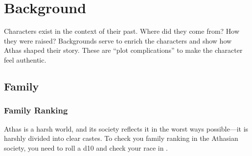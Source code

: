 \section{Background}
Characters exist in the context of their past. Where did they come from? How they were raised? Backgrounds serve to enrich the characters and show how Athas shaped their story. These are ``plot complications'' to make the character feel authentic.

\subsection{Family}

\subsubsection{Family Ranking}
Athas is a harsh world, and its society reflects it in the worst ways possible---it is harshly divided into clear castes. To check you family ranking in the Athasian society, you need to roll a d10 and check your race in .


